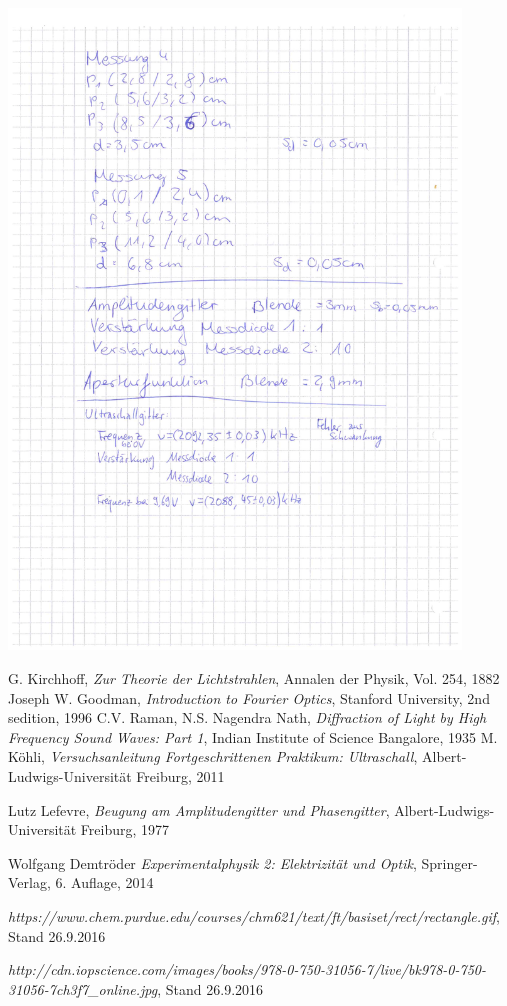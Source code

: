 \documentclass[12pt]{article}
\begin{document}
\begin{minipage}{\textwidth}
\centering
\includegraphics[width=0.9\textwidth]{figures/Laborbuch1.pdf}
\end{minipage}
\newpage
\listoffigures


\newpage
\thispagestyle{empty}
\begin{thebibliography}{9}

  G. Kirchhoff,
  \emph{Zur Theorie der Lichtstrahlen},
  Annalen der Physik,
  Vol. 254,
  1882
  Joseph W. Goodman,
  \emph{Introduction to Fourier Optics},
  Stanford University,
  2nd sedition,
  1996
  C.V. Raman, N.S. Nagendra Nath,
  \emph{Diffraction of Light by High Frequency Sound Waves: Part 1},
  Indian Institute of Science Bangalore,
  1935
  M. Köhli,
  \emph{Versuchsanleitung Fortgeschrittenen Praktikum: Ultraschall},
  Albert-Ludwigs-Universität Freiburg,
  2011
  
  Lutz Lefevre,
  \emph{Beugung am Amplitudengitter und Phasengitter},
  Albert-Ludwigs-Universität Freiburg,
  1977

Wolfgang Demtröder
 \emph{Experimentalphysik 2: Elektrizität und Optik},
 Springer-Verlag,
 6. Auflage,
 2014
 
 \emph{https://www.chem.purdue.edu/courses/chm621/text/ft/basiset/rect/rectangle.gif}, Stand 26.9.2016
 
 \emph{http://cdn.iopscience.com/images/books/978-0-750-31056-7/live/bk978-0-750-31056-7ch3f7\_online.jpg},
 Stand 26.9.2016
\end{thebibliography}
\end{document}
